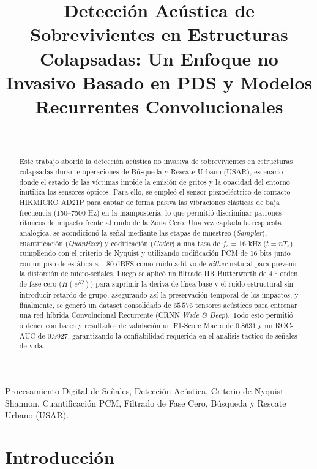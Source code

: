 \documentclass[journal, a4paper]{IEEEtran}
\title{Detección Acústica de Sobrevivientes en Estructuras Colapsadas: Un Enfoque no Invasivo Basado en PDS y Modelos Recurrentes Convolucionales}
\author{
    \IEEEauthorblockN{Carlos Carreño Castaños} \\
    \vspace{0.2cm}
    \IEEEauthorblockA{\textit{Postgrado en Ingeniería Eléctrica / Procesamiento Digital de Señales} \\
    \textit{Facultad de Ingeniería, Escuela de Ingeniería Eléctrica, Universidad Central de Venezuela (UCV)}\\
    Caracas, Venezuela \\
    Correo electrónico: carlosaccantonio@gmail.com}
}
\begin{document}
\maketitle

\begin{abstract}
Este trabajo abordó la detección acústica no invasiva de sobrevivientes en estructuras colapsadas durante operaciones de Búsqueda y Rescate Urbano (USAR), escenario donde el estado de las víctimas impide la emisión de gritos y la opacidad del entorno inutiliza los sensores ópticos. Para ello, se empleó el sensor piezoeléctrico de contacto HIKMICRO AD21P para captar de forma pasiva las vibraciones elásticas de baja frecuencia (150--7500 Hz) en la mampostería, lo que permitió discriminar patrones rítmicos de impacto frente al ruido de la Zona Cero. Una vez captada la respuesta analógica, se acondicionó la señal mediante las etapas de muestreo (\textit{Sampler}), cuantificación (\textit{Quantizer}) y codificación (\textit{Coder}) a una tasa de $f_s = 16\text{ kHz}$ ($t = nT_s$), cumpliendo con el criterio de Nyquist y utilizando codificación PCM de 16 bits junto con un piso de estática a $-80\text{ dBFS}$ como ruido aditivo de \textit{dither} natural para prevenir la distorsión de micro-señales. Luego se aplicó un filtrado IIR Butterworth de 4.º orden de fase cero ($H(e^{j\Omega})$) para suprimir la deriva de línea base y el ruido estructural sin introducir retardo de grupo, asegurando así la preservación temporal de los impactos, y finalmente, se generó un dataset consolidado de $65\,576$ tensores acústicos para entrenar una red híbrida Convolucional Recurrente (CRNN \textit{Wide \& Deep}). Todo esto permitió obtener con bases y resultados de validación un F1-Score Macro de $0.8631$ y un ROC-AUC de $0.9927$, garantizando la confiabilidad requerida en el análisis táctico de señales de vida.
\end{abstract}

\begin{IEEEkeywords}
Procesamiento Digital de Señales, Detección Acústica, Criterio de Nyquist-Shannon, Cuantificación PCM, Filtrado de Fase Cero, Búsqueda y Rescate Urbano (USAR).
\end{IEEEkeywords}


\section{Introducción}
\end{document}
